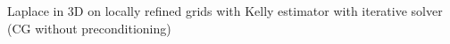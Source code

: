 Laplace in 3D
on locally refined grids with Kelly estimator
with iterative solver (CG without preconditioning)

